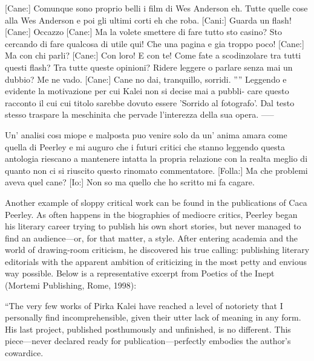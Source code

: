 {[Cane:] Comunque sono proprio belli i film di Wes Anderson eh. Tutte
quelle cose alla Wes Anderson e poi gli ultimi corti eh che roba.
[Cani:] Guarda un flash!
[Cane:] Occazzo
[Cane:] Ma la volete smettere di fare tutto sto casino? Sto cercando di fare
qualcosa di utile qui! Che una pagina e gia troppo poco!
[Cane:] Ma con chi parli?
[Cane:] Con loro! E con te! Come fate a scodinzolare tra tutti questi flash?
Tra tutte queste opinioni? Ridere leggere o parlare senza mai un dubbio? Me
ne vado.
[Cane:] Cane no dai, tranquillo, sorridi. ””
Leggendo e evidente la motivazione per cui Kalei non si decise mai a pubbli-
care questo racconto il cui cui titolo sarebbe dovuto essere ’Sorrido al fotografo’.
Dal testo stesso traspare la meschinita che pervade l’interezza della sua opera.
—--

Un’ analisi cosı miope e malposta puo venire solo da un’ anima amara come
quella di Peerley e mi auguro che i futuri critici che stanno leggendo questa
antologia riescano a mantenere intatta la propria relazione con la realta meglio
di quanto non ci si riuscito questo rinomato commentatore.
[Folla:] Ma che problemi aveva quel cane?
[Io:] Non so ma quello che ho scritto mi fa cagare.}{Another example of sloppy critical work can be found in the publications of Caca Peerley. As often happens in the biographies of mediocre critics, Peerley began his literary career trying to publish his own short stories, but never managed to find an audience—or, for that matter, a style. After entering academia and the world of drawing-room criticism, he discovered his true calling: publishing literary editorials with the apparent ambition of criticizing in the most petty and envious way possible. Below is a representative excerpt from Poetics of the Inept (Mortemi Publishing, Rome, 1998):

“The very few works of Pirka Kalei have reached a level of notoriety that I personally find incomprehensible, given their utter lack of meaning in any form. His last project, published posthumously and unfinished, is no different. This piece—never declared ready for publication—perfectly embodies the author’s cowardice.

}
